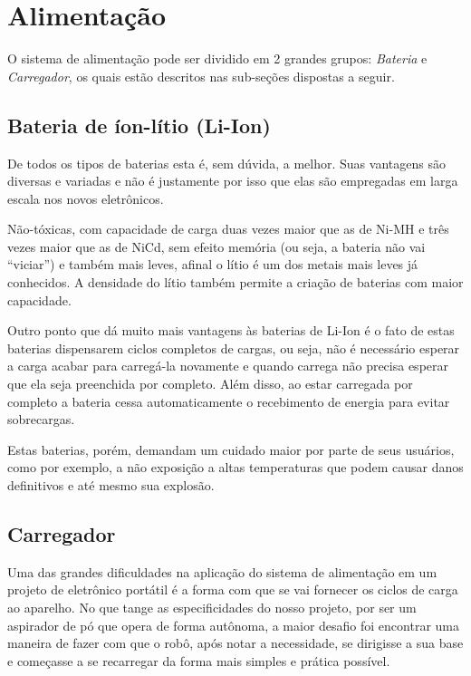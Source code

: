
\section{Alimentação} %
\label{sec:alimentação}
	
	O sistema de alimentação pode ser dividido em 2 grandes grupos: \textit{Bateria} e \textit{Carregador}, os quais estão descritos nas sub-seções dispostas a seguir.

	\subsection{Bateria de íon-lítio (Li-Ion)} %
	\label{sub:bateria}
		
		De todos os tipos de baterias esta é, sem dúvida, a melhor. Suas vantagens são diversas e variadas e não é justamente por isso que elas são empregadas em larga escala nos novos eletrônicos.

Não-tóxicas, com capacidade de carga duas vezes maior que as de Ni-MH e três vezes maior que as de NiCd, sem efeito memória (ou seja, a bateria não vai “viciar”) e também mais leves, afinal o lítio é um dos metais mais leves já conhecidos. A densidade do lítio também permite a criação de baterias com maior capacidade.

Outro ponto que dá muito mais vantagens às baterias de Li-Ion é o fato de estas baterias dispensarem ciclos completos de cargas, ou seja, não é necessário esperar a carga acabar para carregá-la novamente e quando carrega não precisa esperar que ela seja preenchida por completo. Além disso, ao estar carregada por completo a bateria cessa automaticamente o recebimento de energia para evitar sobrecargas.

Estas baterias, porém, demandam um cuidado maior por parte de seus usuários, como por exemplo, a não exposição a altas temperaturas que podem causar danos definitivos e até mesmo sua explosão.

	\subsection{Carregador} %
	\label{sub:carregador}
	
		Uma das grandes dificuldades na aplicação do sistema de alimentação em um projeto de eletrônico portátil é a forma com que se vai fornecer os ciclos de carga ao aparelho. No que tange as especificidades do nosso projeto, por ser um aspirador de pó que opera de forma autônoma, a maior desafio foi encontrar uma maneira de fazer com que o robô, após notar a necessidade, se dirigisse a sua base e começasse a se recarregar da forma mais simples e prática possível. 

